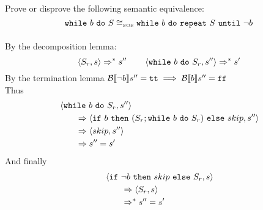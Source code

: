 \begin{exercise}{
    Prove or disprove the following semantic equivalence:
    \[ \texttt{while}\ b\ \texttt{do}\ S \cong_{\text{\tiny SOS}} \texttt{while}\ b\ \texttt{do}\ \texttt{repeat}\ S\ \texttt{until}\ \neg b  \]\vspace*{-0.6cm}
}
\begin{itemize}
\begin{itemize}
\begin{align*}
                \end{align*}
                By the decomposition lemma:
                \[ \left<S_r, s\right> \Rightarrow^* s'' \qquad \left<\texttt{while}\ b\ \texttt{do}\ S_r, s''\right> \Rightarrow^* s' \]
                By the termination lemma $\mathcal{B} \llbracket \neg b \rrbracket s'' = \texttt{tt} \implies \mathcal{B} \llbracket b \rrbracket s'' = \texttt{ff}$ \\
                Thus
                \begin{align*}
                    &\left<\texttt{while}\ b\ \texttt{do}\ S_r, s''\right>
                    \\&\qquad\Rightarrow \left<\texttt{if}\ b\ \texttt{then}\ (S_r; \texttt{while}\ b\ \texttt{do}\ S_r)\ \texttt{else}\ skip, s''\right>
                    \\&\qquad\Rightarrow \left<skip, s''\right>
                    \\&\qquad\Rightarrow s'' = s'
                \end{align*}
                And finally
                \begin{align*}
                    &\left<\texttt{if}\ \neg b\ \texttt{then}\ skip\ \texttt{else}\ S_r, s\right>
                    \\&\qquad\Rightarrow \left<S_r, s\right>
                    \\&\qquad\Rightarrow^* s'' = s'
                \end{align*}
            \end{itemize}
    \end{itemize}
\end{exercise}
